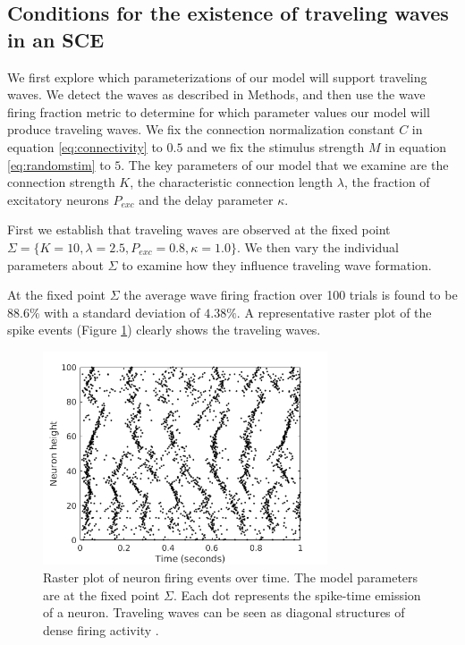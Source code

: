 \documentclass[12pt]{article}
\begin{document}
\subsection{Conditions for the existence of traveling waves in an SCE} \label{sub:waves}
We first explore which parameterizations of our model will support traveling waves.
We detect the waves as described in Methods, and then use the wave firing fraction metric to determine for which parameter values our model will produce traveling waves.
We fix the connection normalization constant $C$ in equation \ref{eq:connectivity} to $0.5$ and we fix the stimulus strength $M$ in equation \ref{eq:randomstim} to $5$.
The key parameters of our model that we examine are the connection strength $K$, the characteristic connection length $\lambda$, the fraction of excitatory neurons $P_{exc}$ and the delay parameter $\kappa$.

First we establish that traveling waves are observed at the fixed point $\Sigma = \{K=10,\lambda=2.5,P_{exc}=0.8,\kappa=1.0 \}$.
We then vary the individual parameters about $\Sigma$ to examine how they influence traveling wave formation.

At the fixed point $\Sigma$ the average wave firing fraction over 100 trials is found to be $88.6\%$ with a standard deviation of $4.38\%$.
A representative raster plot of the spike events (Figure \ref{fig:sigma_raster}) clearly shows the traveling waves.
\begin{figure}[!htb]
 \centering
 \includegraphics[width=0.75\textwidth]{fig/baseline}
 \caption{Raster plot of neuron firing events over time. The model parameters are at the fixed point $\Sigma$. Each dot represents the spike-time emission of a neuron. Traveling waves can be seen as diagonal structures of dense firing activity \parencite{Senk2018}. }
 \label{fig:sigma_raster}
\end{figure}
\end{document}
